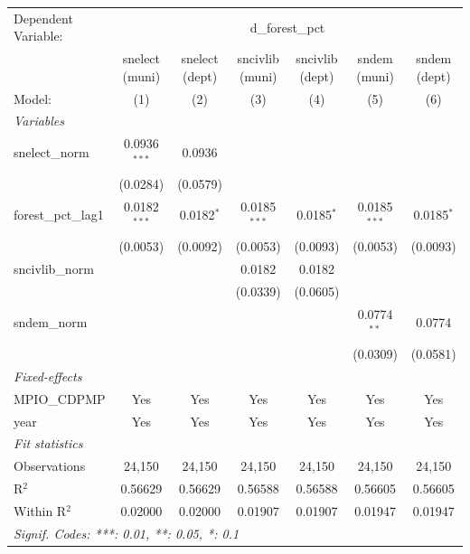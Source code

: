 
\begingroup
\centering
\begin{tabular}{lcccccc}
   \tabularnewline \midrule \midrule
   Dependent Variable: & \multicolumn{6}{c}{d\_forest\_pct}\\
                       & snelect (muni) & snelect (dept) & sncivlib (muni) & sncivlib (dept) & sndem (muni)   & sndem (dept) \\   
   Model:              & (1)            & (2)            & (3)             & (4)             & (5)            & (6)\\  
   \midrule
   \emph{Variables}\\
   snelect\_norm       & 0.0936$^{***}$ & 0.0936         &                 &                 &                &   \\   
                       & (0.0284)       & (0.0579)       &                 &                 &                &   \\   
   forest\_pct\_lag1   & 0.0182$^{***}$ & 0.0182$^{*}$   & 0.0185$^{***}$  & 0.0185$^{*}$    & 0.0185$^{***}$ & 0.0185$^{*}$\\   
                       & (0.0053)       & (0.0092)       & (0.0053)        & (0.0093)        & (0.0053)       & (0.0093)\\   
   sncivlib\_norm      &                &                & 0.0182          & 0.0182          &                &   \\   
                       &                &                & (0.0339)        & (0.0605)        &                &   \\   
   sndem\_norm         &                &                &                 &                 & 0.0774$^{**}$  & 0.0774\\   
                       &                &                &                 &                 & (0.0309)       & (0.0581)\\   
   \midrule
   \emph{Fixed-effects}\\
   MPIO\_CDPMP         & Yes            & Yes            & Yes             & Yes             & Yes            & Yes\\  
   year                & Yes            & Yes            & Yes             & Yes             & Yes            & Yes\\  
   \midrule
   \emph{Fit statistics}\\
   Observations        & 24,150         & 24,150         & 24,150          & 24,150          & 24,150         & 24,150\\  
   R$^2$               & 0.56629        & 0.56629        & 0.56588         & 0.56588         & 0.56605        & 0.56605\\  
   Within R$^2$        & 0.02000        & 0.02000        & 0.01907         & 0.01907         & 0.01947        & 0.01947\\  
   \midrule \midrule
   \multicolumn{7}{l}{\emph{Signif. Codes: ***: 0.01, **: 0.05, *: 0.1}}\\
\end{tabular}
\par\endgroup


